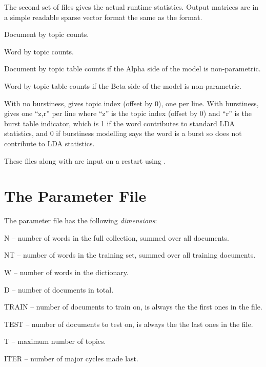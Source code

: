 \documentclass[a4paper,english]{article}
\begin{document}
The second set of files gives the actual runtime statistics.
Output matrices are in a simple readable sparse vector format
the same as the  format.
\begin{Description}\setlength{\itemsep}{0cm}
\item[\File{RepStem.ndt}] Document by topic counts.
\item[\File{RepStem.nwt}] Word by topic counts.
\item[\File{RepStem.tdt}] Document by topic table counts if
the Alpha side of the model is non-parametric.
\item[\File{RepStem.twt}] Word by topic table counts if
the Beta side of the model is non-parametric.
\item[\File{RepStem.zt}] With no burstiness, gives topic
index (offset by 0), one per line.  
With burstiness, gives one ``z,r'' per line where ``z'' is the
topic index (offset by 0) and ``r'' is the burst table indicator, 
which is 1 if the word
contributes to standard LDA statistics, and
0 if burstiness modelling says the word is a burst
so does not contribute to LDA statistics.
\end{Description}
These files along with  are input
on a restart using .

\section{The Parameter File}

The parameter file has the following \emph{dimensions}:
\begin{Description}[T]
\item{N} -- number of words in the full collection,
          summed over all documents.
\item{NT} -- number of words in the training set,
          summed over all training documents.
\item{W} -- number of words in the dictionary.
\item{D} -- number of documents in total.
\item{TRAIN} -- number of documents to train on, is always the
the first ones in the file.
\item{TEST} -- number of documents to test on, is always the
the last ones in the file.
\item{T} -- maximum number of topics.
\item{ITER} -- number of major cycles made last.
\end{Description}
\end{document}
